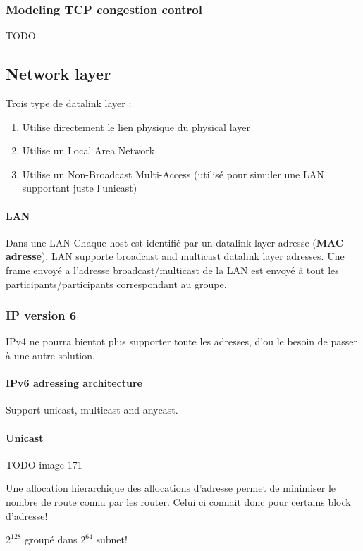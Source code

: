 \subsubsection{Modeling TCP congestion control}
TODO

\subsection{Network layer}
Trois type de datalink layer :
\begin{enumerate}
    \item Utilise directement le lien physique du physical layer
    \item Utilise un Local Area Network
    \item Utilise un Non-Broadcast Multi-Access (utilisé pour simuler une LAN supportant
        juste l'unicast)
\end{enumerate}

\paragraph{LAN} Dans une LAN Chaque host est identifié par un datalink layer adresse
(\textbf{MAC adresse}).
LAN supporte broadcast and multicast datalink layer adresses. Une frame envoyé a l'adresse
broadcast/multicast de la LAN est envoyé à tout les participants/participants correspondant
au groupe.

\subsubsection{IP version 6}
IPv4 ne pourra bientot plus supporter toute les adresses, d'ou le besoin
de passer à une autre solution.

\paragraph{IPv6 adressing architecture}
Support unicast, multicast and anycast.

\paragraph{Unicast}
TODO image 171

Une allocation hierarchique des allocations d'adresse permet de minimiser
le nombre de route connu par les router. Celui ci connait donc pour
certains block d'adresse!

$2^{128}$ groupé dans $2^{64}$ subnet!


